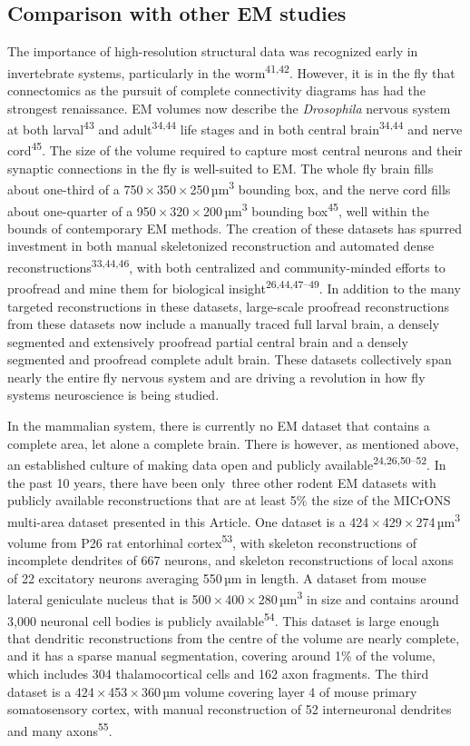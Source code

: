 \documentclass{article}
\begin{document}
\subsection*{Comparison with other EM studies}

The importance of high-resolution structural data was recognized early in invertebrate systems, particularly in the worm\textsuperscript{41,42}. However, it is in the fly that connectomics as the pursuit of complete connectivity diagrams has had the strongest renaissance. EM volumes now describe the \emph{Drosophila} nervous system at both larval\textsuperscript{43} and adult\textsuperscript{34,44} life stages and in both central brain\textsuperscript{34,44} and nerve cord\textsuperscript{45}. The size of the volume required to capture most central neurons and their synaptic connections in the fly is well-suited to EM. The whole fly brain fills about one-third of a 750\,×\,350\,×\,250\,µm\textsuperscript{3} bounding box, and the nerve cord fills about one-quarter of a 950\,×\,320\,×\,200\,µm\textsuperscript{3} bounding box\textsuperscript{45}, well within the bounds of contemporary EM methods. The creation of these datasets has spurred investment in both manual skeletonized reconstruction and automated dense reconstructions\textsuperscript{33,44,46}, with both centralized and community-minded efforts to proofread and mine them for biological insight\textsuperscript{26,44,47–49}. In addition to the many targeted reconstructions in these datasets, large-scale proofread reconstructions from these datasets now include a manually traced full larval brain, a densely segmented and extensively proofread partial central brain and a densely segmented and proofread complete adult brain. These datasets collectively span nearly the entire fly nervous system and are driving a revolution in how fly systems neuroscience is being studied.

In the mammalian system, there is currently no EM dataset that contains a complete area, let alone a complete brain. There is however, as mentioned above, an established culture of making data open and publicly available\textsuperscript{24,26,50–52}. In the past 10 years, there have been only~three other rodent EM datasets with publicly available reconstructions that are at least 5\% the size of the MICrONS multi-area dataset presented in this Article. One dataset is a 424\,×\,429\,×\,274\,µm\textsuperscript{3} volume from P26 rat entorhinal cortex\textsuperscript{53}, with skeleton reconstructions of incomplete dendrites of 667 neurons, and skeleton reconstructions of local axons of 22 excitatory neurons averaging 550\,µm in length. A dataset from mouse lateral geniculate nucleus that is 500\,×\,400\,×\,280\,µm\textsuperscript{3} in size and contains around 3,000 neuronal cell bodies is publicly available\textsuperscript{54}. This dataset is large enough that dendritic reconstructions from the centre of the volume are nearly complete, and it has a sparse manual segmentation, covering around 1\% of the volume, which includes 304 thalamocortical cells and 162 axon fragments. The third dataset is a 424\,×\,453\,×\,360\,µm volume covering layer 4 of mouse primary somatosensory cortex, with manual reconstruction of 52 interneuronal dendrites and many axons\textsuperscript{55}.
\end{document}
